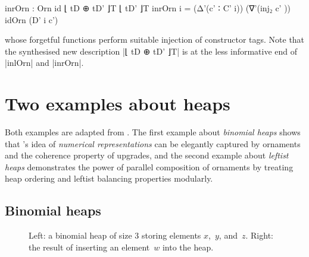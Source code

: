 {\begin{code}
inrOrn  : Orn id ⌊ tD ⊕ tD' ⌋T ⌊ tD' ⌋T
inrOrn  i  =  (Δ'(c'  ∶ C' i))  (∇'(inj₂  c'  ))  idOrn (D' i c')
\end{code}
whose forgetful functions perform suitable injection of constructor tags.
Note that the synthesised new description |⌊ tD ⊕ tD' ⌋T| is at the less informative end of |inlOrn| and |inrOrn|.}

\section{Two examples about heaps}

Both examples are adapted from .
The first example about \emph{binomial heaps} shows that \citeauthor{Okasaki-data-structures}'s idea of \emph{numerical representations} can be elegantly captured by ornaments and the coherence property of upgrades, and the second example about \emph{leftist heaps} demonstrates the power of parallel composition of ornaments by treating heap ordering and leftist balancing properties modularly.

\subsection{Binomial heaps}

\begin{figure}
\parskip
\caption{Left: a binomial heap of size 3 storing elements $x$,~$y$, and~$z$. Right: the result of inserting an element~$w$ into the heap.}
\label{fig:binomial-heap}
\end{figure}

